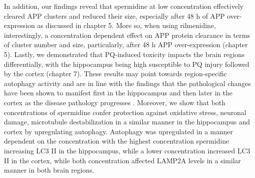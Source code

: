 In addition, our findings reveal that spermidine at low concentration effectively cleared APP clusters and reduced their size, especially after 48 h of APP over-expression as discussed in chapter 5. More so, when using rilmenidine, interestingly, a concentration dependent effect on APP protein clearance in terms of  cluster number and size, particularly, after 48 h APP over-expression (chapter 5). Lastly, we demonstrated that PQ-induced toxicity impacts the brain regions differentially, with the hippocampus being high susceptible to PQ injury followed by the cortex (chapter 7). These results may point towards region-specific autophagy activity and are in line with the findings that the pathological changes have been shown to manifest first in the hippocampus and then later in the cortex as the disease pathology progresses \citep{Braak2004,Braak1998,Braak1991,Braak2012}. Moreover, we show that both concentrations of spermidine confer protection against oxidative stress, neuronal damage, microtubule destabilization in a similar manner in the hippocampus and cortex by upregulating autophagy. Autophagy was upregulated in a manner dependent on the concentration with the highest concentration spermidine increasing LC3 II in the hippocampus, while a lower concentration increased LC3 II in the cortex, while both concentration affected LAMP2A levels in a similar manner in both brain regions. 
